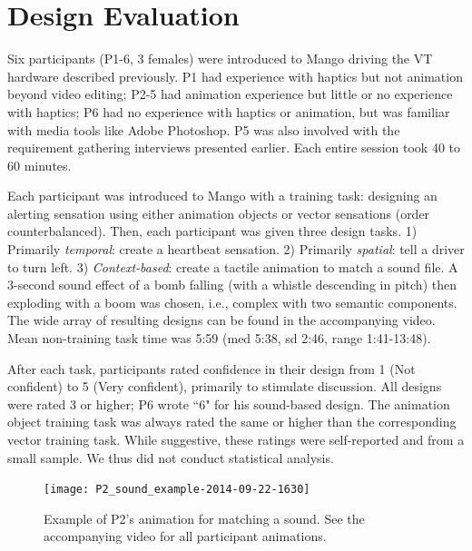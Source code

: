 %
%
\section{Design Evaluation}
Six participants (P1-6, 3 females) were introduced to Mango driving %
the  VT hardware described previously. %
P1 had experience with haptics but not animation beyond video editing;
P2-5 had animation experience but little or no experience with haptics;
P6 had no experience with haptics or animation, but was familiar with media tools like Adobe Photoshop.
P5 was also involved with the requirement gathering interviews presented earlier.
Each entire session took 40 to 60 minutes.


Each participant was introduced to Mango with a training task: %
designing an alerting sensation using %
either animation objects or vector sensations (order counterbalanced).
Then, each participant was given three design tasks.
1) Primarily \emph{temporal}: create a heartbeat sensation.
2) Primarily \emph{spatial}: tell a driver to turn left.
3) \emph{Context-based}: create a tactile animation to match a sound file.
A 3-second sound effect of a bomb falling (with a whistle descending in pitch) then exploding with a boom was chosen, i.e., complex with two semantic components.
The wide array of resulting designs can be found in the accompanying video.
Mean non-training task time was 5:59 (med 5:38, sd 2:46, range 1:41-13:48).

After each task, participants rated confidence in their design from 1 (Not confident) to 5 (Very confident), primarily to stimulate discussion.
All designs were rated 3 or higher; P6 wrote ``6" for his sound-based design.
The animation object training task was always rated the same or higher than the corresponding vector training task.
While suggestive, these ratings were self-reported and from a small sample.
We thus did not conduct statistical analysis.


%
%
\begin{figure}[htb] %
   \centering
	   	\texttt{[image: P2\_sound\_example-2014-09-22-1630]} 

	\caption{Example of P2's animation for matching a sound. See the accompanying video for all participant animations.}
	\label{fig:animation:example:p2}
\end{figure}



